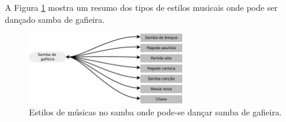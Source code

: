 A Figura \ref{fig:gafieiradancaestilos} mostra um resumo dos 
tipos de estilos musicais onde pode ser dançado samba de gafieira.
\begin{figure}[h]
  \centering
    \includegraphics[width=0.6\textwidth]{chapters/cap-historia-sambagafieira/gafieiravcmusica.eps}
  \caption{ Estilos de músicas no samba onde pode-se dançar samba de gafieira.}
\label{fig:gafieiradancaestilos}
\end{figure}

